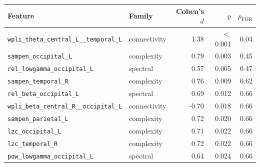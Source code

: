 \begin{tabular}{@{}llrrr@{}}
\toprule
Feature & Family & Cohen's $d$ & $p$ & $p_\text{FDR}$ \\
\midrule
\texttt{wpli\_theta\_central\_L\_\_temporal\_L} & connectivity & 1.38 & $<$0.001 & 0.04 \\
\texttt{sampen\_occipital\_L} & complexity & 0.79 & 0.003 & 0.45 \\
\texttt{rel\_lowgamma\_occipital\_L} & spectral & 0.57 & 0.005 & 0.47 \\
\texttt{sampen\_temporal\_R} & complexity & 0.76 & 0.009 & 0.62 \\
\texttt{rel\_beta\_occipital\_L} & spectral & 0.69 & 0.012 & 0.66 \\
\texttt{wpli\_beta\_central\_R\_\_occipital\_L} & connectivity & -0.70 & 0.018 & 0.66 \\
\texttt{sampen\_parietal\_L} & complexity & 0.72 & 0.020 & 0.66 \\
\texttt{lzc\_occipital\_L} & complexity & 0.71 & 0.022 & 0.66 \\
\texttt{lzc\_temporal\_R} & complexity & 0.72 & 0.022 & 0.66 \\
\texttt{pow\_lowgamma\_occipital\_L} & spectral & 0.64 & 0.024 & 0.66 \\
\bottomrule
\end{tabular}
